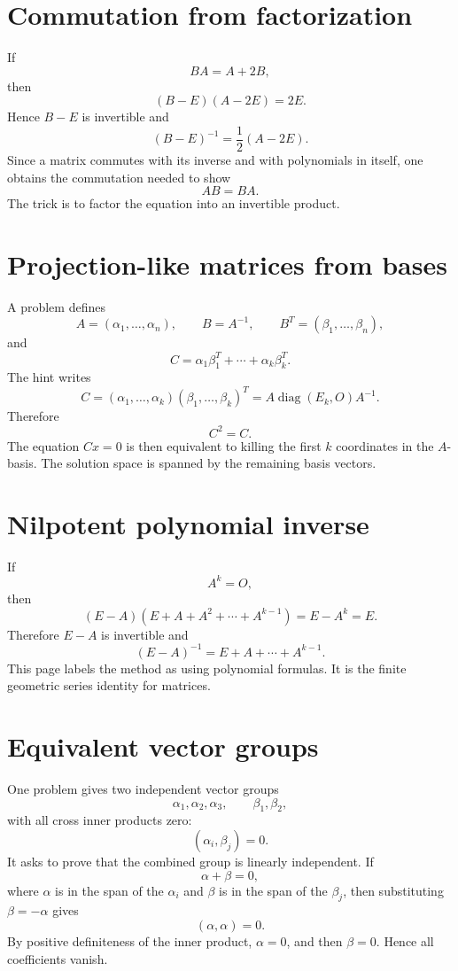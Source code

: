 \section{Commutation from factorization}

If
\[
  BA=A+2B,
\]
then
\[
  (B-E)(A-2E)=2E.
\]
Hence $B-E$ is invertible and
\[
  (B-E)^{-1}=
\frac12(A-2E).
\]
Since a matrix commutes with its inverse and with polynomials in itself, one obtains the commutation needed to show
\[
  AB=BA.
\]
The trick is to factor the equation into an invertible product.

\section{Projection-like matrices from bases}

A problem defines
\[
  A=(\alpha_1,\ldots,\alpha_n),\qquad
  B=A^{-1},\qquad
  B^T=(\beta_1,\ldots,\beta_n),
\]
and
\[
  C=\alpha_1\beta_1^T+\cdots+\alpha_k\beta_k^T.
\]
The hint writes
\[
  C=(\alpha_1,\ldots,\alpha_k)(\beta_1,\ldots,\beta_k)^T
  =A\operatorname{diag}(E_k,O)A^{-1}.
\]
Therefore
\[
  C^2=C.
\]
The equation $Cx=0$ is then equivalent to killing the first $k$ coordinates in the $A$-basis.  The solution space is spanned by the remaining basis vectors.

\section{Nilpotent polynomial inverse}

If
\[
  A^k=O,
\]
then
\[
  (E-A)(E+A+A^2+\cdots+A^{k-1})=E-A^k=E.
\]
Therefore $E-A$ is invertible and
\[
  (E-A)^{-1}=E+A+\cdots+A^{k-1}.
\]
This page labels the method as using polynomial formulas.  It is the finite geometric series identity for matrices.

\section{Equivalent vector groups}

One problem gives two independent vector groups
\[
  \alpha_1,\alpha_2,\alpha_3,\qquad \beta_1,\beta_2,
\]
with all cross inner products zero:
\[
  (\alpha_i,\beta_j)=0.
\]
It asks to prove that the combined group is linearly independent.  If
\[
  \alpha+\beta=0,
\]
where $\alpha$ is in the span of the $\alpha_i$ and $\beta$ is in the span of the $\beta_j$, then substituting $\beta=-\alpha$ gives
\[
  (\alpha,\alpha)=0.
\]
By positive definiteness of the inner product, $\alpha=0$, and then $\beta=0$.  Hence all coefficients vanish.

